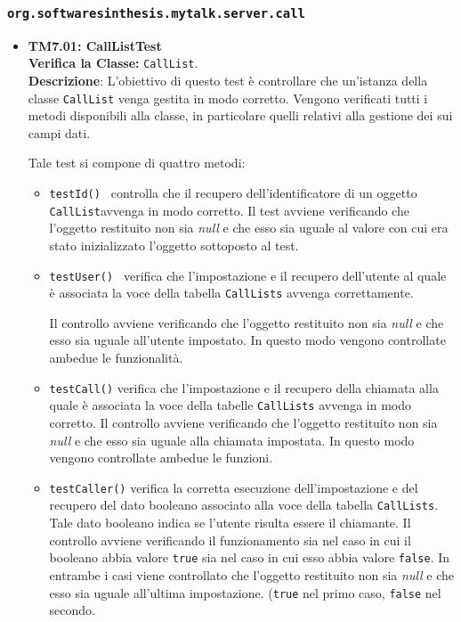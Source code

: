 \subsubsection{\texttt{org.softwaresinthesis.mytalk.server.call}}
\begin{itemize}
\item \textbf{TM7.01: CallListTest}\\
\textbf{Verifica la Classe:} \texttt{CallList}.\\
\textbf{Descrizione}: L'obiettivo di questo test è controllare che un'istanza della classe  \texttt{CallList} venga gestita in modo corretto. Vengono verificati tutti i metodi disponibili alla classe, in particolare quelli relativi alla gestione dei sui campi dati.

Tale test si compone di quattro metodi:
\begin{itemize}
\item \texttt{testId() } controlla che il recupero dell'identificatore di un oggetto \texttt{CallList}avvenga in modo corretto. 
Il test avviene verificando che l'oggetto restituito non sia \textit{null} e che esso sia uguale al valore con cui era stato inizializzato l'oggetto sottoposto al test.

\item \texttt{testUser() } verifica che l'impostazione e il recupero dell'utente al quale è associata la voce della tabella \texttt{CallLists} avvenga correttamente. 

Il controllo avviene verificando che l'oggetto restituito non sia \textit{null} e che esso sia uguale all'utente impostato. In questo modo vengono controllate ambedue le funzionalità.

\item \texttt{testCall()} verifica che l'impostazione e il recupero della chiamata alla quale è associata la voce della tabelle \texttt{CallLists} avvenga in modo corretto. Il controllo avviene verificando che l'oggetto restituito non sia \textit{null} e che esso sia uguale alla chiamata impostata. In questo modo vengono controllate ambedue le funzioni.

\item \texttt{testCaller()} verifica la corretta esecuzione  dell'impostazione e del recupero del dato booleano associato alla voce della tabella \texttt{CallLists}. Tale dato booleano indica se l'utente risulta essere il chiamante.
Il controllo avviene verificando il funzionamento sia nel caso in cui il booleano abbia valore \texttt{true} sia nel caso in cui esso abbia valore \texttt{false}.
In entrambe i casi viene controllato che l'oggetto restituito non sia \textit{null} e che esso sia uguale all'ultima impostazione. (\texttt{true} nel primo caso, \texttt{false} nel secondo.


\end{itemize}
\end{itemize}
